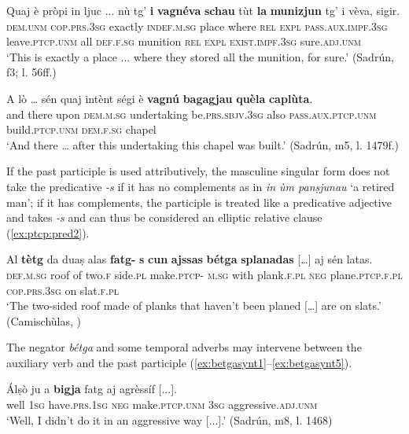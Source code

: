 \ea\label{ex:ptcp:agr3}
\gll  Quaj è pròpi in ljuc ... nù tg’ \textbf{i} \textbf{vagnéva} \textbf{schau} tùt \textbf{la} \textbf{munizjun} tg’ i vèva, sigir.\\
\textsc{dem.unm} \textsc{cop.prs.3sg} exactly \textsc{indef.m.sg} place {} where \textsc{rel} \textsc{expl} \textsc{pass.aux.impf.3sg} leave.\textsc{ptcp.unm} all \textsc{def.f.sg} munition \textsc{rel} \textsc{expl} \textsc{exist.impf.3sg} sure.\textsc{adj.unm}\\
\glt `This is exactly a place ... where they stored all the munition, for sure.' (Sadrún, f3; l. 56ff.)
\z

\ea\label{ex:ptcp:agr5}
\gll    A lò … sén quaj intènt ségi è \textbf{vagnú} \textbf{bagagjau} \textbf{quèla} \textbf{caplùta}.\\
and there {} upon \textsc{dem.m.sg} undertaking be.\textsc{prs.sbjv.3sg} also \textsc{pass.aux.ptcp.unm} build.\textsc{ptcp.unm} \textsc{dem.f.sg} chapel \\
\glt `And there … after this undertaking this chapel was built.' (Sadrún, m5, l. 1479f.)
\z

If the past participle is used attributively, the masculine singular form does not take the predicative \textit{-s} if it has no complements as in \textit{in ùm panṣjunau} `a retired man'; if it has complements, the participle is treated like a predicative adjective and takes \textit{-s} and can thus be considered an elliptic relative clause (\ref{ex:ptcp:pred2}).

\ea\label{ex:ptcp:pred2}
\gll  Al \textbf{tètg} da duaṣ alas \textbf{fatg-} \textbf{s} \textbf{cun} \textbf{ajssas} \textbf{bétga} \textbf{splanadas} […] aj sén latas.\\
\textsc{def.m.sg} roof of two.\textsc{f} side.\textsc{pl} make.\textsc{ptcp-} \textsc{m.sg} with plank.\textsc{f.pl} \textsc{neg}  plane.\textsc{ptcp.f.pl} {} \textsc{cop.prs.3sg} on slat.\textsc{f.pl}\\
\glt `The two-sided roof made of planks that haven't been planed […] are on slats.' (Camischùlas, )
\z

The negator \textit{bétga} and some temporal adverbs may intervene between the auxiliary verb and the past participle (\ref{ex:betgasynt1}--\ref{ex:betgasynt5}).

\ea\label{ex:betgasynt1}
\gll  Álṣò ju a \textbf{bigja} fatg aj agrèssíf [...].  \\
well \textsc{1sg} have.\textsc{prs.1sg} \textsc{neg} make.\textsc{ptcp.unm} \textsc{3sg} aggressive.\textsc{adj.unm}\\
\glt `Well, I didn’t do it in an aggressive way [...].' (Sadrún, m8, l. 1468)
\z


